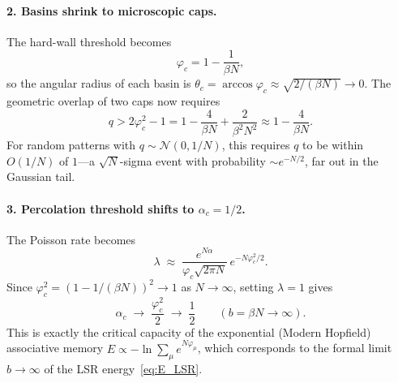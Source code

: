 \documentclass[11pt]{article}
\newcommand{\vp}{\varphi}
\begin{document}
\paragraph{2. Basins shrink to microscopic caps.}
The hard-wall threshold becomes
\begin{equation}\label{eq:phic_bN}
  \vp_c = 1 - \frac{1}{\beta N},
\end{equation}
so the angular radius of each basin is
$\theta_c = \arccos\vp_c \approx \sqrt{2/(\beta N)} \to 0$.
The geometric overlap of two caps now requires
\begin{equation}\label{eq:geom_bN}
  q > 2\vp_c^2 - 1 = 1 - \frac{4}{\beta N}
    + \frac{2}{\beta^2 N^2}
  \approx 1 - \frac{4}{\beta N}.
\end{equation}
For random patterns with $q \sim \mathcal{N}(0, 1/N)$,
this requires $q$ to be within $O(1/N)$ of $1$---a
$\sqrt{N}$-sigma event with probability
$\sim e^{-N/2}$, far out in the Gaussian tail.

\paragraph{3. Percolation threshold shifts to $\alpha_c = 1/2$.}
The Poisson rate becomes
\begin{equation}
  \lambda \;\approx\;
  \frac{e^{N\alpha}}{\vp_c\sqrt{2\pi N}}\,
  e^{-N\vp_c^2/2}.
\end{equation}
Since $\vp_c^2 = (1 - 1/(\beta N))^2 \to 1$ as $N \to \infty$,
setting $\lambda = 1$ gives
\begin{equation}\label{eq:alpha_c_bN}
  \alpha_c \;\to\; \frac{\vp_c^2}{2} \;\to\; \frac{1}{2}
  \qquad (b = \beta N \to \infty).
\end{equation}
This is exactly the critical capacity of the exponential
(Modern Hopfield) associative memory
$E \propto -\ln\sum_\mu e^{N\vp_\mu}$, which corresponds to
the formal limit $b \to \infty$ of the LSR energy~\eqref{eq:E_LSR}.
\end{document}
